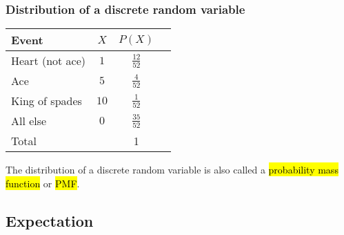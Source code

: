 \documentclass[slidestop,compress,mathserif]{beamer}
\begin{document}

\begin{frame}
\frametitle{Distribution of a discrete random variable}


\pause
\begin{small}
\begin{center}
\renewcommand{\arraystretch}{1.5}
\begin{tabular}{l | c | c | c }
Event		& $X$ 		& $P(X)$        		 \\
\hline
Heart (not ace)	& $1$		& $\frac{12}{52}$	 \\
Ace			& $5$		& $\frac{4}{52}$	 \\	
King of spades	& $10$		& $\frac{1}{52}$	 \\	
All else		& $0$		& $\frac{35}{52}$	\\
\hline
Total			&			&		1		
\end{tabular}

\end{center}
\end{small}

\pause

The distribution of a discrete random variable is also called a \hl{probability mass function} or \hl{PMF}.
\end{frame}



\subsection{Expectation}

\end{document}
